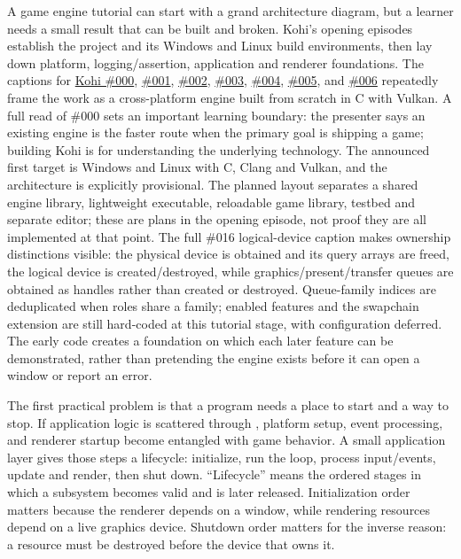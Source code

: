 A game engine tutorial can start with a grand architecture diagram, but a learner needs a small result that can be built and broken. Kohi's opening episodes establish the project and its Windows and Linux build environments, then lay down platform, logging/assertion, application and renderer foundations. The captions for \href{https://www.youtube.com/watch?v=teg23SJlyl8}{Kohi \#000}, \href{https://www.youtube.com/watch?v=F6_WdnzQIQ4}{\#001}, \href{https://www.youtube.com/watch?v=NIv1mygBOcg}{\#002}, \href{https://www.youtube.com/watch?v=l9e8PJskYnI}{\#003}, \href{https://www.youtube.com/watch?v=ojEPsZFPj2Q}{\#004}, \href{https://www.youtube.com/watch?v=nGgvWzoCsyk}{\#005}, and \href{https://www.youtube.com/watch?v=jEbqCf-MsZs}{\#006} repeatedly frame the work as a cross-platform engine built from scratch in C with Vulkan. A full read of \#000 sets an important learning boundary: the presenter says an existing engine is the faster route when the primary goal is shipping a game; building Kohi is for understanding the underlying technology. The announced first target is Windows and Linux with C, Clang and Vulkan, and the architecture is explicitly provisional. The planned layout separates a shared engine library, lightweight executable, reloadable game library, testbed and separate editor; these are plans in the opening episode, not proof they are all implemented at that point. The full \#016 logical-device caption makes ownership distinctions visible: the physical device is obtained and its query arrays are freed, the logical device is created/destroyed, while graphics/present/transfer queues are obtained as handles rather than created or destroyed. Queue-family indices are deduplicated when roles share a family; enabled features and the swapchain extension are still hard-coded at this tutorial stage, with configuration deferred. The early code creates a foundation on which each later feature can be demonstrated, rather than pretending the engine exists before it can open a window or report an error.

The first practical problem is that a program needs a place to start and a way to stop. If application logic is scattered through , platform setup, event processing, and renderer startup become entangled with game behavior. A small application layer gives those steps a lifecycle: initialize, run the loop, process input/events, update and render, then shut down. ``Lifecycle'' means the ordered stages in which a subsystem becomes valid and is later released. Initialization order matters because the renderer depends on a window, while rendering resources depend on a live graphics device. Shutdown order matters for the inverse reason: a resource must be destroyed before the device that owns it.

